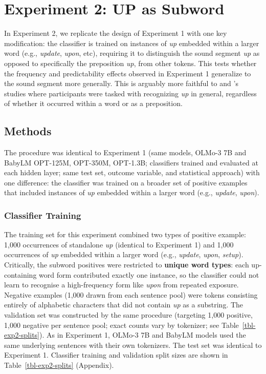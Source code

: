 \documentclass[11pt]{article}
\begin{document}
\section{Experiment 2: UP as Subword}\label{experiment-2-up-as-subword}

In Experiment 2, we replicate the design of Experiment 1 with one key
modification: the classifier is trained on instances of \emph{up}
embedded within a larger word (e.g., \emph{update}, \emph{upon}, etc),
requiring it to distinguish the sound segment \emph{up} as opposed to
specifically the preposition \emph{up}, from other tokens. This tests
whether the frequency and predictability effects observed in Experiment
1 generalize to the sound segment more generally. This is arguably more
faithful to \citet{kapatsinski2010frequencyuseleads} and
\citet{houghton2025multiwordrepresentationsminds}'s studies where
participants were tasked with recognizing \emph{up} in general,
regardless of whether it occurred within a word or as a preposition.

\subsection{Methods}\label{methods-1}

The procedure was identical to Experiment 1 (same models, OLMo-3 7B and
BabyLM OPT-125M, OPT-350M, OPT-1.3B; classifiers trained and evaluated
at each hidden layer; same test set, outcome variable, and statistical
approach) with one difference: the classifier was trained on a broader
set of positive examples that included instances of \emph{up} embedded
within a larger word (e.g., \emph{update}, \emph{upon}).

\subsubsection{Classifier Training}\label{classifier-training-1}

The training set for this experiment combined two types of positive
example: 1,000 occurrences of standalone \emph{up} (identical to
Experiment 1) and 1,000 occurrences of \emph{up} embedded within a
larger word (e.g., \emph{update}, \emph{upon}, \emph{setup}).
Critically, the subword positives were restricted to \textbf{unique word
types}: each up-containing word form contributed exactly one instance,
so the classifier could not learn to recognise a high-frequency form
like \emph{upon} from repeated exposure. Negative examples (1,000 drawn
from each sentence pool) were tokens consisting entirely of alphabetic
characters that did not contain \emph{up} as a substring. The validation
set was constructed by the same procedure (targeting 1,000 positive,
1,000 negative per sentence pool; exact counts vary by tokenizer; see
Table~\ref{tbl-exp2-splits}). As in Experiment 1, OLMo-3 7B and BabyLM
models used the same underlying sentences with their own tokenizers. The
test set was identical to Experiment 1. Classifier training and
validation split sizes are shown in Table~\ref{tbl-exp2-splits}
(Appendix).
\end{document}
